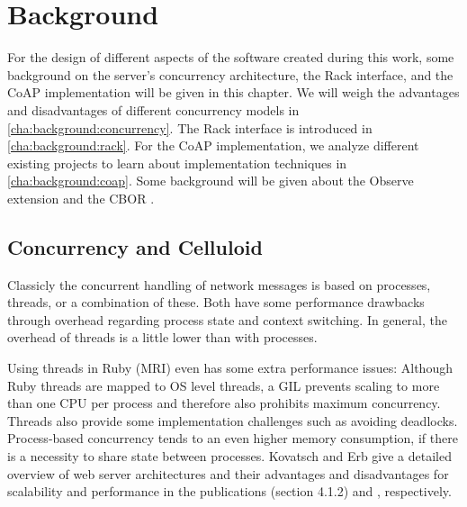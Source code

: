 \chapter{Background}
\label{cha:background}

For the design of different aspects of the software created during this work,
some background on the server's concurrency architecture, the Rack interface,
and the \ac{CoAP} implementation will be given in this chapter. We will weigh
the advantages and disadvantages of different concurrency models in
\autoref{cha:background:concurrency}. The Rack interface is introduced in
\autoref{cha:background:rack}. For the \ac{CoAP} implementation, we analyze
different existing projects to learn about implementation techniques in
\autoref{cha:background:coap}. Some background will be given about the Observe
extension \cite{observe} and the \ac{CBOR} \cite{cbor}.

\section{Concurrency and Celluloid}
\label{cha:background:concurrency}


	Classicly the concurrent handling of network messages is based on
	processes, threads, or a combination of these. Both have some performance
	drawbacks through overhead regarding process state and context switching.
	In general, the overhead of threads is a little lower than with processes.
	
	Using threads in Ruby (\ac{MRI}) even has some extra performance issues:
	Although Ruby threads are mapped to \ac{OS} level threads, a \ac{GIL}
	prevents scaling to more than one \ac{CPU} per process and therefore
	also prohibits maximum concurrency. Threads also provide some
	implementation challenges such as avoiding deadlocks. Process-based
	concurrency tends to an even higher memory consumption, if there is a
	necessity to share state between processes. Kovatsch and Erb give a
	detailed overview of web server architectures and their advantages and
	disadvantages for scalability and performance in the publications
	 \cite{scalable-iot} (section 4.1.2) and
	 \cite{scalable-web}, respectively.

